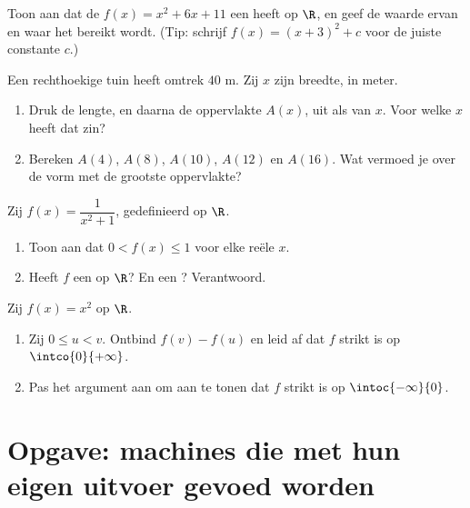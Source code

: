 \begin{exercise}[$\star\star$]\label{exo:g10:functions:7}
Toon aan dat de  $f(x) = x^2 + 6x + 11$ een  heeft op $\R$, en
geef de waarde ervan en waar het bereikt wordt. (Tip: schrijf
$f(x) = (x + 3)^2 + c$ voor de juiste constante $c$.)
\end{exercise}

\begin{exercise}[$\star\star$]\label{exo:g10:functions:8}
Een rechthoekige tuin heeft omtrek $40$ m. Zij $x$ zijn breedte, in meter.
\begin{enumerate}
  \item Druk de lengte, en daarna de oppervlakte $A(x)$, uit als  van
        $x$. Voor welke $x$ heeft dat zin?
  \item Bereken $A(4)$, $A(8)$, $A(10)$, $A(12)$ en $A(16)$. Wat vermoed je
        over de vorm met de grootste oppervlakte?
\end{enumerate}
\end{exercise}

\begin{exercise}[$\star\star$]\label{exo:g10:functions:9}
Zij $f(x) = \dfrac{1}{x^2 + 1}$, gedefinieerd op $\R$.
\begin{enumerate}
  \item Toon aan dat $0 < f(x) \leq 1$ voor elke reële $x$.
  \item Heeft $f$ een  op $\R$? En een ? Verantwoord.
\end{enumerate}
\end{exercise}

\begin{exercise}[$\star\star\star$]\label{exo:g10:functions:10}
Zij $f(x) = x^2$ op $\R$.
\begin{enumerate}
  \item Zij $0 \leq u < v$. Ontbind $f(v) - f(u)$ en leid af dat $f$ strikt
         is op $\intco{0}{+\infty}$.
  \item Pas het argument aan om aan te tonen dat $f$ strikt  is op
        $\intoc{-\infty}{0}$.
\end{enumerate}
\end{exercise}

\section{Opgave: machines die met hun eigen uitvoer gevoed worden}

